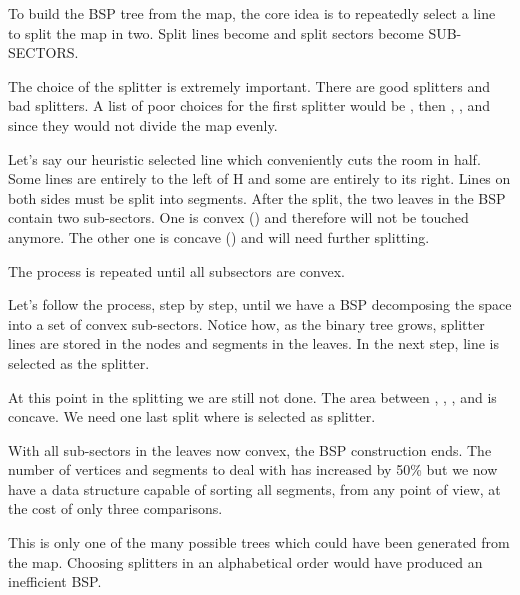 To build the BSP tree from the map, the core idea is to repeatedly select a line to split the map in two. Split lines become  and split sectors become {SUB-SECTORS}.\\ 
\par
The choice of the splitter is extremely important. There are good splitters and bad splitters. A list of poor choices for the first splitter would be , then , , and  since they would not divide the map evenly.\\ 
\par
Let's say our heuristic selected line  which conveniently cuts the room in half. Some lines are entirely to the left of H and some are entirely to its right. Lines on both sides must be split into segments.  After the split, the two leaves in the BSP contain two sub-sectors. One is convex () and therefore will not be touched anymore. The other one is concave () and will need further splitting.\\
\par
 The process is repeated until all subsectors are convex.\\
\par
{}
\par

Let's follow the process, step by step, until we have a BSP decomposing the space into a set of convex sub-sectors. Notice how, as the binary tree grows, splitter lines are stored in the nodes and segments in the leaves. In the next step, line  is selected as the splitter.
\par
{}
\par
At this point in the splitting we are still not done. The area between , , , and  is concave. We need one last split where  is selected as splitter.\\ 
\par
{}
\par
With all sub-sectors in the leaves now convex, the BSP construction ends. The number of vertices and segments to deal with has increased by 50\% but we now have a data structure capable of sorting all segments, from any point of view, at the cost of only three comparisons.\\
\par
This is only one of the many possible trees which could have been generated from the map. Choosing splitters in an alphabetical order would have produced an inefficient BSP.\\




